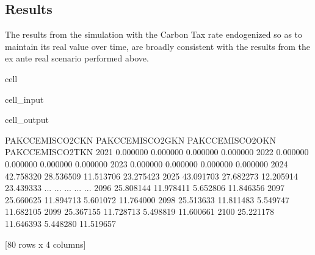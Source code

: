\documentclass[letterpaper,10pt,english]{jupyterBook}
\begin{document}
\subsection{Results}
\label{\detokenize{content/05_WBModels/MoreComplexScenarios:results}}
\sphinxAtStartPar
The results from the simulation with the Carbon Tax rate endogenized so as to maintain its real value over time, are broadly consistent with the results from the ex ante real scenario performed above.

\begin{sphinxuseclass}{cell}\begin{sphinxVerbatimInput}

\begin{sphinxuseclass}{cell_input}
\begin{sphinxVerbatim}[commandchars=\\\{\}]
\PYG{p}{[}\PYG{p}{]}
\end{sphinxVerbatim}

\end{sphinxuseclass}\end{sphinxVerbatimInput}
\begin{sphinxVerbatimOutput}

\begin{sphinxuseclass}{cell_output}
\begin{sphinxVerbatim}[commandchars=\\\{\}]
      PAKCCEMISCO2CKN  PAKCCEMISCO2GKN  PAKCCEMISCO2OKN  PAKCCEMISCO2TKN
2021         0.000000         0.000000         0.000000         0.000000
2022         0.000000         0.000000         0.000000         0.000000
2023         0.000000         0.000000         0.000000         0.000000
2024       \PYGZhy{}42.758320       \PYGZhy{}28.536509       \PYGZhy{}11.513706       \PYGZhy{}23.275423
2025       \PYGZhy{}43.091703       \PYGZhy{}27.682273       \PYGZhy{}12.205914       \PYGZhy{}23.439333
...               ...              ...              ...              ...
2096       \PYGZhy{}25.808144       \PYGZhy{}11.978411        \PYGZhy{}5.652806       \PYGZhy{}11.846356
2097       \PYGZhy{}25.660625       \PYGZhy{}11.894713        \PYGZhy{}5.601072       \PYGZhy{}11.764000
2098       \PYGZhy{}25.513633       \PYGZhy{}11.811483        \PYGZhy{}5.549747       \PYGZhy{}11.682105
2099       \PYGZhy{}25.367155       \PYGZhy{}11.728713        \PYGZhy{}5.498819       \PYGZhy{}11.600661
2100       \PYGZhy{}25.221178       \PYGZhy{}11.646393        \PYGZhy{}5.448280       \PYGZhy{}11.519657

[80 rows x 4 columns]
\end{sphinxVerbatim}

\end{sphinxuseclass}\end{sphinxVerbatimOutput}

\end{sphinxuseclass}
\end{document}
